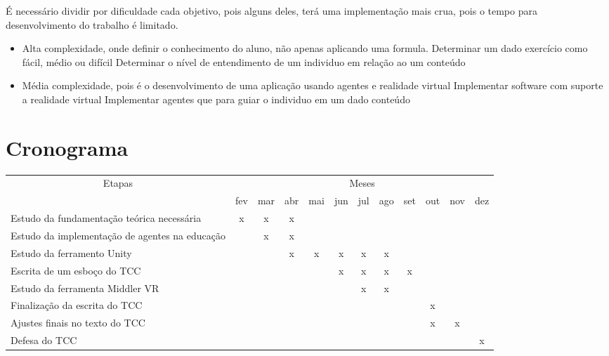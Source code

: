 \documentclass[12pt]{article}
\begin{document}
    É necessário dividir por dificuldade cada objetivo, pois alguns deles, terá uma implementação
    mais crua, pois o tempo para desenvolvimento do trabalho é limitado.

    \begin{itemize}
        \item Alta complexidade, onde definir o conhecimento do aluno, não apenas aplicando uma formula.
        \subitem Determinar um dado exercício como fácil, médio ou difícil
        \subitem Determinar o nível de entendimento de um individuo em relação ao um conteúdo
        \item Média complexidade, pois é o desenvolvimento de uma aplicação usando agentes e realidade virtual
        \subitem Implementar software com suporte a realidade virtual
        \subitem Implementar agentes que para guiar o individuo em um dado conteúdo
    \end{itemize}

\newpage
\section{Cronograma}

   \begin{tabularx}{\linewidth}{|X|*{11}{c|}}
        \hline
        \multicolumn{1}{|c|}{\multirow{2}{*}{Etapas}} & \multicolumn{11}{|c|}{Meses}\\ \cline{2-12}
        & fev & mar & abr & mai & jun & jul & ago & set & out & nov & dez   \\ \hline

        Estudo da fundamentação teórica necessária
        &  x  &  x  &  x   &     &      &      &      &      &      &     &      \\ \hline

        Estudo da implementação de agentes na educação
        &     &  x  &  x  &     &      &      &      &      &      &     &     \\ \hline

        Estudo da ferramento Unity
        &     &    &  x  &  x  &  x  &  x  &  x   &     &     &     &   \\ \hline

        Escrita de um esboço do TCC
        &     &     &     &     &  x & x  &  x  &   x   &    &    &     \\ \hline

       Estudo da ferramenta Middler VR
        &     &    &     &     &     &  x   &  x   &   &    &     &      \\ \hline

        Finalização da escrita do TCC
        &     &    &     &     &     &     &     &    &   x  &     &     \\ \hline

        Ajustes finais no texto do TCC
         &     &    &     &     &     &     &     &    &    x  &  x  &   \\ \hline

        Defesa do TCC
        &   &   &   &   &   &   &  &  &   &   &  x  \\ \hline

    \end{tabularx}
\end{document}
